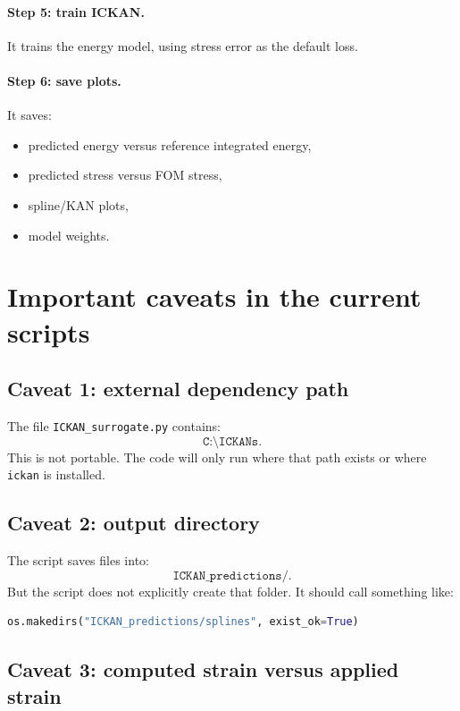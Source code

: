 \documentclass[11pt]{article}
\begin{document}
\paragraph{Step 5: train ICKAN.}

It trains the energy model, using stress error as the default loss.

\paragraph{Step 6: save plots.}

It saves:

\begin{itemize}[leftmargin=2em]
  \item predicted energy versus reference integrated energy,
  \item predicted stress versus FOM stress,
  \item spline/KAN plots,
  \item model weights.
\end{itemize}

\section{Important caveats in the current scripts}

\subsection{Caveat 1: external dependency path}

The file \texttt{ICKAN\_surrogate.py} contains:
\[
  \texttt{C:\textbackslash ICKANs}.
\]
This is not portable. The code will only run where that path exists or where
\texttt{ickan} is installed.

\subsection{Caveat 2: output directory}

The script saves files into:
\[
  \texttt{ICKAN\_predictions/}.
\]
But the script does not explicitly create that folder. It should call something
like:

\begin{lstlisting}[language=Python]
os.makedirs("ICKAN_predictions/splines", exist_ok=True)
\end{lstlisting}

\subsection{Caveat 3: computed strain versus applied strain}
\end{document}
